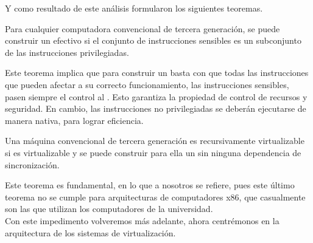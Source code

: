 \noindent Y como resultado de este análisis formularon los siguientes teoremas.
\begin{teorema}
Para cualquier computadora convencional de tercera generación, se puede construir un  efectivo si el conjunto de instrucciones sensibles es un subconjunto de las instrucciones privilegiadas.
\end{teorema}

\noindent Este teorema implica que para construir un  basta con que todas las instrucciones que pueden afectar a su correcto funcionamiento, las instrucciones sensibles, pasen siempre el control al . Esto garantiza la propiedad de control de recursos y seguridad. En cambio, las instrucciones no privilegiadas se deberán ejecutarse de manera nativa, para lograr eficiencia.

\begin{teorema}
Una máquina convencional de tercera generación es recursivamente virtualizable si es virtualizable y se puede construir para ella un  sin ninguna dependencia de sincronización.
\end{teorema}

\noindent Este teorema es fundamental, en lo que a nosotros se refiere, pues este último teorema no se cumple para arquitecturas de computadores x86, que casualmente son las que utilizan los computadores de la universidad.\\

\noindent Con este impedimento volveremos más adelante, ahora centrémonos en la arquitectura de los sistemas de virtualización.
